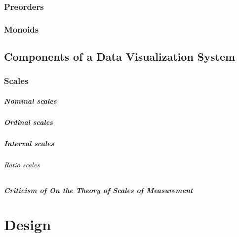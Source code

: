 \documentclass[
]{book}
\begin{document}
\hypertarget{preorders}{%
\subsection{Preorders}\label{preorders}}

\hypertarget{monoids}{%
\subsection{Monoids}\label{monoids}}

\hypertarget{components-of-a-data-visualization-system}{%
\section{Components of a Data Visualization System}\label{components-of-a-data-visualization-system}}

\hypertarget{scales}{%
\subsection{Scales}\label{scales}}

\hypertarget{nominal-scales}{%
\paragraph{Nominal scales}\label{nominal-scales}}

\hypertarget{ordinal-scales}{%
\paragraph{Ordinal scales}\label{ordinal-scales}}

\hypertarget{interval-scales}{%
\paragraph{Interval scales}\label{interval-scales}}

\hypertarget{ratio-scales}{%
\subparagraph{Ratio scales}\label{ratio-scales}}

\hypertarget{criticism-of-on-the-theory-of-scales-of-measurement}{%
\paragraph{Criticism of On the Theory of Scales of Measurement}\label{criticism-of-on-the-theory-of-scales-of-measurement}}

\hypertarget{design}{%
\chapter{Design}\label{design}}
\end{document}
